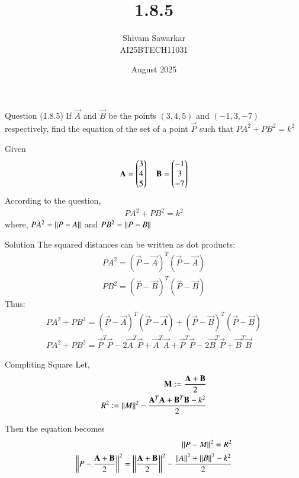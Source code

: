 \documentclass{beamer}
\title %
{1.8.5}
\date{August  2025}
\author %
{Shivam Sawarkar \\ AI25BTECH11031}
\begin{document}
\frame{\titlepage}
\begin{frame}{Question (1.8.5)}
If $\vec{A}$ and $\vec{B}$ be the points $(3,4,5)$ and $(-1,3,-7)$ respectively, find the equation of the set of a point $\vec{P}$ such that $PA^2+PB^2=k^2$
\end{frame}

\begin{frame}{Given}
    \begin{align}
    \mathbf{A}=\begin{pmatrix}3 \\ 4 \\ 5\end{pmatrix} \quad \mathbf{B}=\begin{pmatrix}-1 \\ 3 \\ -7\end{pmatrix}
\end{align}
According to the question,  
\begin{align}
    PA^2+PB^2=k^2
\end{align}
where, $PA^2=\left\lVert P-A\right\rVert$ and $PB^2=\left\lVert P-B\right\rVert$
\end{frame}

\begin{frame}{Solution}
    The squared distances can be written as dot products:
\begin{align}
    PA^2=(\vec{P}-\vec{A})^T(\vec{P}-\vec{A}) \\
    PB^2=(\vec{P}-\vec{B})^T(\vec{P}-\vec{B})
\end{align}
Thus:
\begin{align}
    PA^2+PB^2=(\vec{P}-\vec{A})^T(\vec{P}-\vec{A})+(\vec{P}-\vec{B})^T(\vec{P}-\vec{B}) \\
    PA^2+PB^2=\vec{P}^T\vec{P}-2\vec{A}^T\vec{P}+\vec{A}^T\vec{A}+\vec{P}^T\vec{P}-2\vec{B}^T\vec{P}+\vec{B}^T\vec{B}
\end{align}
\end{frame}

\begin{frame}{Compliting Square}
    Let, \\ 
\begin{align}
    \mathbf{M}:=\frac{\mathbf{A}+\mathbf{B}}{2} \\ 
    R^2:=\left\lVert M\right\rVert^2-\frac{\mathbf{A}^T\mathbf{A}+\mathbf{B}^T\mathbf{B}-k^2}{2}
\end{align}

Then the equation becomes\\ 
\begin{align}
    \left\lVert P-M\right\rVert^2=R^2 \\ 
    \left\lVert P-\frac{\mathbf{A}+\mathbf{B}}{2}\right\rVert^2=\left\lVert\frac{\mathbf{A}+\mathbf{B}}{2}\right\rVert^2-\frac{\left\lVert A\right\rVert^2+\left\lVert B\right\rVert^2-k^2}{2}
\end{align}
\end{frame}
\end{document}
